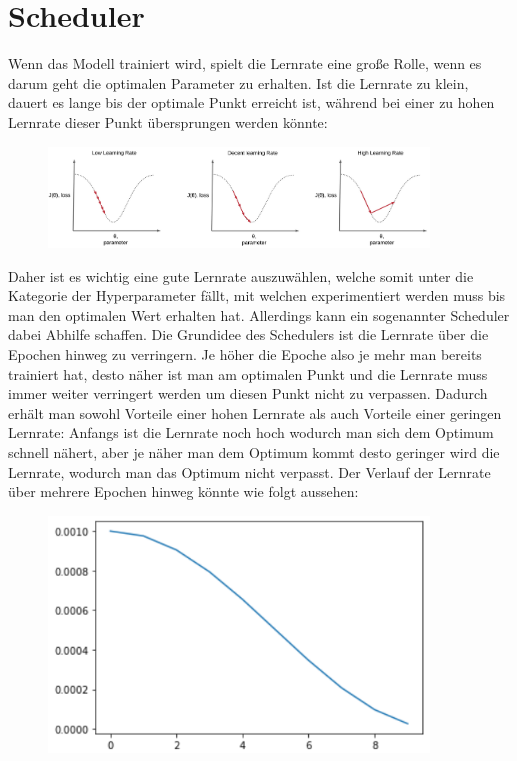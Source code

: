 \documentclass[11pt, a4paper]{article}
\begin{document}
\section{Scheduler}
Wenn das Modell trainiert wird, spielt die Lernrate eine große Rolle, wenn es darum geht die optimalen Parameter zu erhalten. Ist die Lernrate zu klein, dauert es lange bis der optimale Punkt erreicht ist, während bei einer zu hohen Lernrate dieser Punkt übersprungen werden könnte:
\begin{figure}[h]
\centering
\includegraphics[width=0.9\textwidth]{lernrates-vs.png}
\end{figure}
Daher ist es wichtig eine gute Lernrate auszuwählen, welche somit unter die Kategorie der Hyperparameter fällt, mit welchen experimentiert werden muss bis man den optimalen Wert erhalten hat. Allerdings kann ein sogenannter Scheduler dabei Abhilfe schaffen. Die Grundidee des Schedulers ist die Lernrate über die Epochen hinweg zu verringern. Je höher die Epoche also je mehr man bereits trainiert hat, desto näher ist man am optimalen Punkt und die Lernrate muss immer weiter verringert werden um diesen Punkt nicht zu verpassen. Dadurch erhält man sowohl Vorteile einer hohen Lernrate als auch Vorteile einer geringen Lernrate: Anfangs ist die Lernrate noch hoch wodurch man sich dem Optimum schnell nähert, aber je näher man dem Optimum kommt desto geringer wird die Lernrate, wodurch man das Optimum nicht verpasst. Der Verlauf der Lernrate über mehrere Epochen hinweg könnte wie folgt aussehen:
\begin{figure}[h]
\centering
\includegraphics[width=0.9\textwidth]{lernrate-scheduler.png}
\end{figure}
\end{document}
